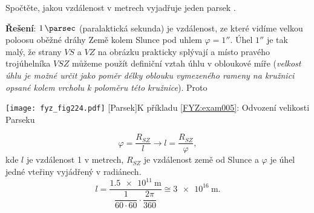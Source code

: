 \wikitextrule
\begin{example}\label{FYZ:exam005}
  Spočtěte, jakou vzdálenost v metrech vyjadřuje jeden parsek \cite[s.~3]{Kulhanek2009}.
  
  \textbf{Řešení}: \(\SI{1}{\parsec}\) (paralaktická sekunda) je vzdálenost, ze které vidíme 
  velkou poloosu oběžné dráhy Země kolem Slunce pod uhlem \(\varphi = \ang{;;1}\). Úhel 
  \(\ang{;;1}\) je tak malý, že strany \(VS\) a \(VZ\) na obrázku prakticky splývají a místo 
  pravého trojúhelníka $VSZ$ můžeme použít definiční vztah úhlu v obloukové míře (\emph{velkost 
  úhlu je možné určit jako poměr délky oblouku vymezeného rameny na kružnici opsané kolem 
  vrcholu k poloměru této kružnice}). Proto 
  
   {\centering
    \captionsetup{type=figure}
    \texttt{[image: fyz\_fig224.pdf]}
    [Parsek]{K příkladu \ref{FYZ:exam005}: Odvození velikosti Parseku}
    \label{fyz:fig224}
    \par}
  \begin{equation*}
    \varphi = \frac{R_{SZ}}{l} \rightarrow l = \frac{R_{SZ}}{\varphi},
  \end{equation*}
  kde $l$ je vzdálenost \SI{1}{\parsec} v metrech, $R_{SZ}$ je vzdálenost země od Slunce a 
  $\varphi$ je úhel jedné vteřiny vyjádřený v radiánech. 
  \begin{equation*}
      l = \frac{\SI{1.5e11}{\meter}}{\dfrac{1}{60\cdot60} 
          \cdot\dfrac{2\pi}{360}}\cong \SI{3e16}{\meter}.
  \end{equation*}
\end{example}
\wikitextrule